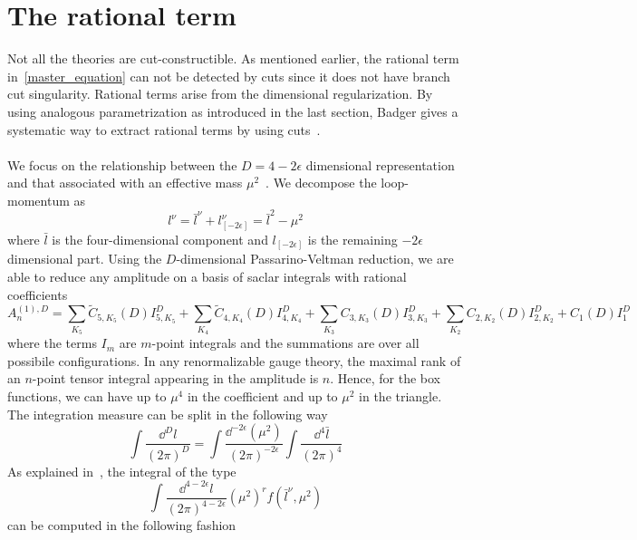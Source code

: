 \section{The rational term}\label{sect-rational}
Not all the theories are cut-constructible. 
As mentioned earlier, the rational term in~\cref{master_equation} can not be detected by cuts since it does not have branch cut singularity. 
Rational terms arise from the dimensional regularization.
By using analogous parametrization as introduced in the last section, 
Badger gives a systematic way to extract rational terms by using cuts~\cite{Badger:2008cm}.
\\\\
We focus on the relationship between the $D = 4-2\epsilon$ dimensional representation and that associated with an effective mass $\mu^2$~\cite{Mahlon:1993si}.
We decompose the loop-momentum as
\begin{equation}
l^\nu = \bar{l}^\nu + l_{[-2\epsilon]}^\nu = \bar{l}^2 - \mu^2
\end{equation}
where $\bar{l}$ is the four-dimensional component and $l_{[-2\epsilon]}$ is the remaining $-2\epsilon$ dimensional part.
Using the $D$-dimensional Passarino-Veltman reduction, we are able to reduce any amplitude on a basis of saclar integrals with rational coefficients
\begin{equation}
A_n^{(1),D} = \sum_{K_5} \tilde{C}_{5,K_5}(D) I^D_{5,K_5}
+\sum_{K_4} \tilde{C}_{4,K_4}(D) I^D_{4,K_4}
+\sum_{K_3} C_{3,K_3}(D) I^D_{3,K_3}
+\sum_{K_2} C_{2,K_2}(D) I^D_{2,K_2}
+C_1(D)I_1^D
\end{equation}
where the terms $I_m$ are $m$-point integrals and the summations are over all possibile configurations.
In any renormalizable gauge theory, the maximal rank of an $n$-point tensor integral appearing in the amplitude is $n$.
Hence, for the box functions, we can have up to $\mu^4$ in the coefficient and up to $\mu^2$ in the triangle.
\\
The integration measure can be split in the following way
\begin{equation}
\int\frac{\dd^D l}{(2\pi)^D} = 
\int\frac{\dd^{-2\epsilon}(\mu^2)}{(2\pi)^{-2\epsilon}}\int\frac{\dd^4 \bar{l}}{(2\pi)^4}
\end{equation}
As explained in~\cite{Bern:1995db}, the integral of the type
\begin{equation}
\int\frac{\dd^{4-2\epsilon} l}{(2\pi)^{4-2\epsilon}} (\mu^2)^rf(
\bar{l}^\nu,\mu^2) 
\end{equation}
can be computed in the following fashion
